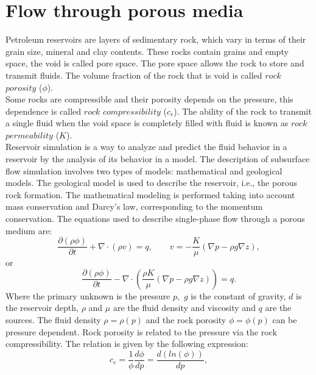 \documentclass[12pt]{article}
\numberwithin{equation}{section}
\begin{document}
 
 \newpage
 \section{Flow through porous media}\label{fpm}
\hspace{0.5cm}
Petroleum reservoirs are layers of sedimentary rock, which vary in terms of their grain size, mineral
and clay contents. 
These rocks contain grains and empty space, the void is called pore space.
The pore space allows the rock to 
store and transmit fluids. The volume fraction of the rock that is void is called $rock$
$porosity$ ($\phi$).\\
Some rocks are compressible and their porosity depends on the pressure, this dependence is called 
$rock$ $compressibility$ ($c_r$). 
The ability of the rock to transmit a single fluid when the void space is completely filled with fluid
is known as $rock$ $permeability$ (${K}$). \\
Reservoir simulation is a way to analyze and predict the fluid behavior in a reservoir
by the analysis of its behavior in a model. The description of subsurface flow simulation involves two types of models: 
mathematical and geological models. The geological model is used to describe the reservoir, i.e., the porous rock formation. 
The mathematical modeling is performed taking into account mass conservation and Darcy's law,
corresponding to the momentum conservation. The equations used to describe single-phase flow through a porous medium are:
\begin{equation}\label{eq:ce}
\frac{\partial (\rho \phi)}{\partial t}+ \nabla \cdot ( \rho {v})=q, \qquad v=-\frac{K}{\mu}(\nabla p-\rho g\nabla z),
\end{equation}
or
\begin{equation}\label{eq:ce1}
\frac{\partial (\rho \phi)}{\partial t}- \nabla \cdot \left( \frac{\rho{K}}{\mu}(\nabla {p}-\rho g\nabla z)\right)=q.
\end{equation}
Where the primary unknown is the pressure ${p},$ $g$ is the constant of gravity, $d$ is the reservoir depth,
$\rho$ and $\mu$ are the fluid density and viscosity and $q$ are the sources. The fluid density $\rho=\rho(p)$ and the rock porosity $\phi=\phi(p)$ can be pressure dependent.
Rock porosity is related to the pressure via the rock compressibility. The relation is given by the following expression:
\begin{equation*}
 c_r=\frac{1}{\phi}\frac{d\phi}{dp}=\frac{d(ln(\phi))}{dp},
\end{equation*}
\end{document}
